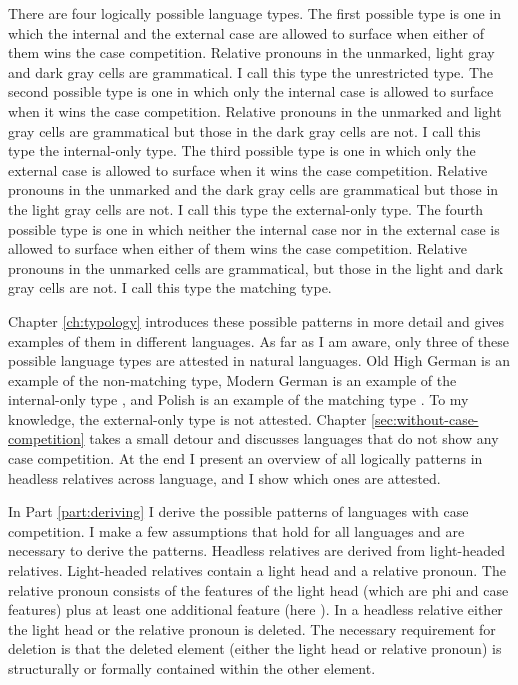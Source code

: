 There are four logically possible language types. The first possible type is one in which the internal and the external case are allowed to surface when either of them wins the case competition. Relative pronouns in the unmarked, light gray and dark gray cells are grammatical. I call this type the unrestricted type. The second possible type is one in which only the internal case is allowed to surface when it wins the case competition. Relative pronouns in the unmarked and light gray cells are grammatical but those in the dark gray cells are not. I call this type the internal-only type. The third possible type is one in which only the external case is allowed to surface when it wins the case competition. Relative pronouns in the unmarked and the dark gray cells are grammatical but those in the light gray cells are not. I call this type the external-only type. The fourth possible type is one in which neither the internal case nor in the external case is allowed to surface when either of them wins the case competition. Relative pronouns in the unmarked cells are grammatical, but those in the light and dark gray cells are not. I call this type the matching type.

Chapter \ref{ch:typology} introduces these possible patterns in more detail and gives examples of them in different languages. As far as I am aware, only three of these possible language types are attested in natural languages. Old High German is an example of the non-matching type, Modern German is an example of the internal-only type \citep{vogel2001}, and Polish is an example of the matching type \citep{citko2013}. To my knowledge, the external-only type is not attested.
Chapter \ref{sec:without-case-competition} takes a small detour and discusses languages that do not show any case competition. At the end I present an overview of all logically patterns in headless relatives across language, and I show which ones are attested.

In Part \ref{part:deriving} I derive the possible patterns of languages with case competition.
I make a few assumptions that hold for all languages and are necessary to derive the patterns. Headless relatives are derived from light-headed relatives. Light-headed relatives contain a light head and a relative pronoun. The relative pronoun consists of the features of the light head (which are phi and case features) plus at least one additional feature (here ). In a headless relative either the light head or the relative pronoun is deleted. The necessary requirement for deletion is that the deleted element (either the light head or relative pronoun) is structurally or formally contained within the other element.

